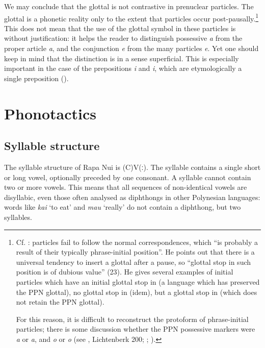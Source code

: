 We may conclude that the glottal is not contrastive in prenuclear particles. The glottal is a phonetic reality only to the extent that particles occur post-pausally.\footnote{\label{fn:37}Cf. \citet[222]{Clark1976}: particles fail to follow the normal correspondences, which “is probably a result of their typically phrase-initial position”. He points out that there is a universal tendency to insert a glottal after a pause, so “glottal stop in such position is of dubious value” (23). He gives several examples of initial particles which have an initial glottal stop in  (a language which has preserved the PPN glottal), no glottal stop in  (idem), but a glottal stop in  (which does not retain the PPN glottal).

For this reason, it is difficult to reconstruct the protoform of phrase-initial particles; there is some discussion whether the PPN possessive markers were \textit{a} or \textit{{\ꞌ}a}, and \textit{o} or \textit{{\ꞌ}o} (see \citealt{Fischer2000Rapanui}, Lichtenberk 200; \citealt{Wilson1982}; \citealt{Lynch1997}).} This does not mean that the use of the glottal symbol in these particles is without justification: it helps the reader to distinguish possessive \textit{{\ꞌ}a} from the proper article \textit{a}, and the conjunction \textit{{\ꞌ}e} from the many particles \textit{e}. Yet one should keep in mind that the distinction is in a sense superficial. This is especially important in the case of the prepositions \textit{{\ꞌ}i} and \textit{i}, which are etymologically a single preposition (). 
\section{Phonotactics}\label{sec:2.3}
\subsection{Syllable structure}\label{sec:2.3.1}
The syllable structure of Rapa Nui is (C)V(ː). The syllable contains a single short or long vowel, optionally preceded by one consonant. A syllable cannot contain two or more vowels. This means that all sequences of non-identical vowels are disyllabic, even those often analysed as diphthongs in other Polynesian languages: words like \textit{kai} ‘to eat’ and \textit{mau} ‘really’ do not contain a diphthong, but two syllables. 

